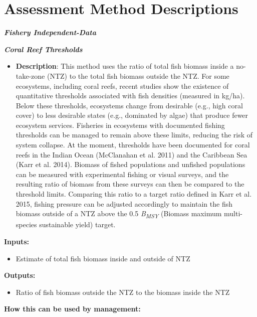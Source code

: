 \documentclass[]{book}
\providecommand{\tightlist}{%
  \setlength{\itemsep}{0pt}\setlength{\parskip}{0pt}}
\begin{document}
\section{Assessment Method
Descriptions}\label{assessment-method-descriptions}

\textbf{\emph{Fishery Independent-Data}}

\textbf{\emph{Coral Reef Thresholds}}

\begin{itemize}
\tightlist
\item
  \textbf{Description}: This method uses the ratio of total fish biomass
  inside a no-take-zone (NTZ) to the total fish biomass outside the NTZ.
  For some ecosystems, including coral reefs, recent studies show the
  existence of quantitative thresholds associated with fish densities
  (measured in kg/ha). Below these thresholds, ecosystems change from
  desirable (e.g., high coral cover) to less desirable states (e.g.,
  dominated by algae) that produce fewer ecosystem services. Fisheries
  in ecosystems with documented fishing thresholds can be managed to
  remain above these limits, reducing the risk of system collapse. At
  the moment, thresholds have been documented for coral reefs in the
  Indian Ocean (McClanahan et al. 2011) and the Caribbean Sea (Karr et
  al. 2014). Biomass of fished populations and unfished populations can
  be measured with experimental fishing or visual surveys, and the
  resulting ratio of biomass from these surveys can then be compared to
  the threshold limits. Comparing this ratio to a target ratio defined
  in Karr et al. 2015, fishing pressure can be adjusted accordingly to
  maintain the fish biomass outside of a NTZ above the 0.5
  \emph{B\textsubscript{MSY}} (Biomass maximum multi-species sustainable
  yield) target.
\end{itemize}

\textbf{Inputs:}

\begin{itemize}
\tightlist
\item
  Estimate of total fish biomass inside and outside of NTZ
\end{itemize}

\textbf{Outputs:}

\begin{itemize}
\tightlist
\item
  Ratio of fish biomass outside the NTZ to the biomass inside the NTZ
\end{itemize}

\textbf{How this can be used by management:}
\end{document}
